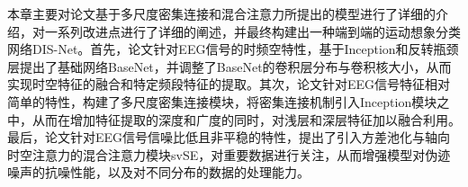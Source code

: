 本章主要对论文基于多尺度密集连接和混合注意力所提出的模型进行了详细的介绍，对一系列改进点进行了详细的阐述，并最终构建出一种端到端的运动想象分类网络DIS-Net。首先，论文针对EEG信号的时频空特性，基于Inception和反转瓶颈层提出了基础网络BaseNet，并调整了BaseNet的卷积层分布与卷积核大小，从而实现时空特征的融合和特定频段特征的提取。其次，论文针对EEG信号特征相对简单的特性，构建了多尺度密集连接模块，将密集连接机制引入Inception模块之中，从而在增加特征提取的深度和广度的同时，对浅层和深层特征加以融合利用。最后，论文针对EEG信号信噪比低且非平稳的特性，提出了引入方差池化与轴向时空注意力的混合注意力模块svSE，对重要数据进行关注，从而增强模型对伪迹噪声的抗噪性能，以及对不同分布的数据的处理能力。

